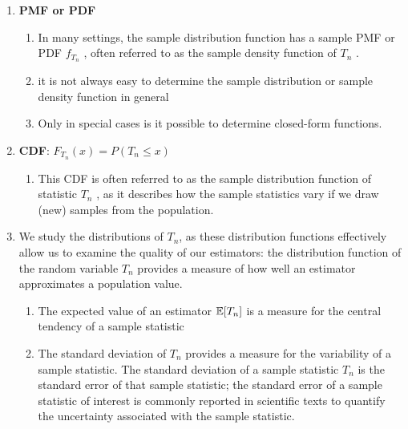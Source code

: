 \begin{enumerate}
    \item \textbf{PMF or PDF} 
    \hfill \cite{statistics/book/Statistics-for-Data-Scientists/Maurits-Kaptein}
    \begin{enumerate}
        \item In many settings, the sample distribution function has a sample PMF or PDF $f _{T_n}$ , often referred to as the sample density function of $T_n$ .
        \hfill \cite{statistics/book/Statistics-for-Data-Scientists/Maurits-Kaptein}
        
        \item  it is not always easy to determine the sample distribution or sample density function in general
        \hfill \cite{statistics/book/Statistics-for-Data-Scientists/Maurits-Kaptein}

        \item Only in special cases is it possible to determine closed-form functions.
        \hfill \cite{statistics/book/Statistics-for-Data-Scientists/Maurits-Kaptein}
    \end{enumerate}

    \item \textbf{CDF}: $F_{T_n} (x) = P (T_n \leq x)$
    \hfill \cite{statistics/book/Statistics-for-Data-Scientists/Maurits-Kaptein}
    \begin{enumerate}
        \item This CDF is often referred to as the sample distribution function of statistic $T_n$ , as it describes how the sample statistics vary if we draw (new) samples from the population.
        \hfill \cite{statistics/book/Statistics-for-Data-Scientists/Maurits-Kaptein}
        
    \end{enumerate}

    \item We study the distributions of $T_n$, as these distribution functions effectively allow us to examine the quality of our estimators: the distribution function of the random variable $T_n$ provides a measure of how well an estimator approximates a population value. 
    \begin{enumerate}
        \item The expected value of an estimator $\mathbb{E}[T_n]$ is a measure for the central tendency of a sample statistic
        \hfill \cite{statistics/book/Statistics-for-Data-Scientists/Maurits-Kaptein}

        \item The standard deviation of $T_n$ provides a measure for the variability of a sample statistic.
        The standard deviation of a sample statistic $T_n$ is the standard error of that sample statistic; 
        the standard error of a sample statistic of interest is commonly reported in scientific texts to quantify the uncertainty associated with the sample statistic.
        \hfill \cite{statistics/book/Statistics-for-Data-Scientists/Maurits-Kaptein}
    \end{enumerate}
\end{enumerate}


